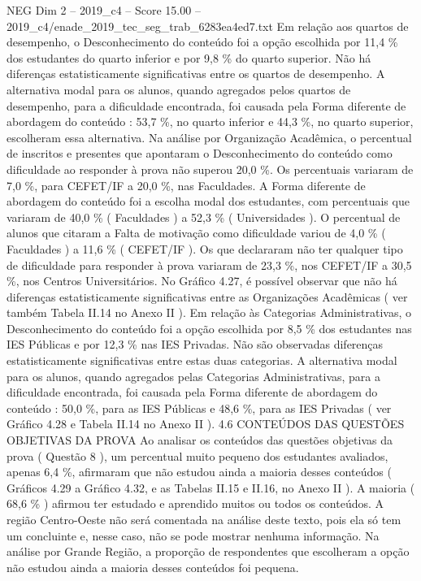 \begin{textsample}{NEG Dim 2 – 2019\_c4 – Score 15.00 – 2019\_c4/enade\_2019\_tec\_seg\_trab\_6283ea4ed7.txt}
Em relação aos quartos de desempenho, o Desconhecimento do conteúdo foi a opção escolhida por 11,4 \% dos estudantes do quarto inferior e por 9,8 \% do quarto superior.
Não há diferenças estatisticamente significativas entre os quartos de desempenho.
A alternativa modal para os alunos, quando agregados pelos quartos de desempenho, para a dificuldade encontrada, foi causada pela Forma diferente de abordagem do conteúdo : 53,7 \%, no quarto inferior e 44,3 \%, no quarto superior, escolheram essa alternativa.
Na análise por Organização Acadêmica, o percentual de inscritos e presentes que apontaram o Desconhecimento do conteúdo como dificuldade ao responder à prova não superou 20,0 \%.
Os percentuais variaram de 7,0 \%, para CEFET/IF a 20,0 \%, nas Faculdades.
A Forma diferente de abordagem do conteúdo foi a escolha modal dos estudantes, com percentuais que variaram de 40,0 \% ( Faculdades ) a 52,3 \% ( Universidades ).
O percentual de alunos que citaram a Falta de motivação como dificuldade variou de 4,0 \% ( Faculdades ) a 11,6 \% ( CEFET/IF ).
Os que declararam não ter qualquer tipo de dificuldade para responder à prova variaram de 23,3 \%, nos CEFET/IF a 30,5 \%, nos Centros Universitários.
No Gráfico 4.27, é possível observar que não há diferenças estatisticamente significativas entre as Organizações Acadêmicas ( ver também Tabela II.14 no Anexo II ).
Em relação às Categorias Administrativas, o Desconhecimento do conteúdo foi a opção escolhida por 8,5 \% dos estudantes nas IES Públicas e por 12,3 \% nas IES Privadas.
Não são observadas diferenças estatisticamente significativas entre estas duas categorias.
A alternativa modal para os alunos, quando agregados pelas Categorias Administrativas, para a dificuldade encontrada, foi causada pela Forma diferente de abordagem do conteúdo : 50,0 \%, para as IES Públicas e 48,6 \%, para as IES Privadas ( ver Gráfico 4.28 e Tabela II.14 no Anexo II ). 4.6 CONTEÚDOS DAS QUESTÕES OBJETIVAS DA PROVA Ao analisar os conteúdos das questões objetivas da prova ( Questão 8 ), um percentual muito pequeno dos estudantes avaliados, apenas 6,4 \%, afirmaram que não estudou ainda a maioria desses conteúdos ( Gráficos 4.29 a Gráfico 4.32, e as Tabelas II.15 e II.16, no Anexo II ).
A maioria ( 68,6 \% ) afirmou ter estudado e aprendido muitos ou todos os conteúdos.
A região Centro-Oeste não será comentada na análise deste texto, pois ela só tem um concluinte e, nesse caso, não se pode mostrar nenhuma informação.
Na análise por Grande Região, a proporção de respondentes que escolheram a opção não estudou ainda a maioria desses conteúdos foi pequena.

\end{textsample}
